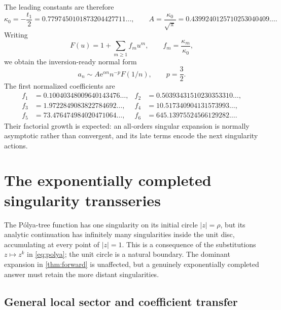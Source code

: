 \documentclass[11pt]{article}
\theoremstyle{definition}
\theoremstyle{remark}
\newcommand{\e}{\mathrm e}
\begin{document}
The leading constants are therefore
\begin{equation}
 \kappa_0=-\frac{t_1}{2}=0.7797450101873204427711\ldots,
 \qquad
 A=\frac{\kappa_0}{\sqrt\pi}
 =0.4399240125710253040409\ldots.
 \label{eq:A-leading}
\end{equation}
Writing
\begin{equation}
 F(u)=1+\sum_{m\geq1}f_mu^m,
 \qquad f_m=\frac{\kappa_m}{\kappa_0},
 \label{eq:F-normalized}
\end{equation}
we obtain the inversion-ready normal form
\begin{equation}
 a_n\sim A\e^{\alpha n}n^{-p}F(1/n),
 \qquad p=\frac32.
 \label{eq:forward-normal}
\end{equation}
The first normalized coefficients are
\begin{align*}
 f_1&=0.10040348009640143476\ldots,&
 f_2&=0.50393431510230353310\ldots,\\
 f_3&=1.9722849083822784692\ldots,&
 f_4&=10.517340904131573993\ldots,\\
 f_5&=73.476474984020471064\ldots,&
 f_6&=645.13975524566129282\ldots.
\end{align*}
Their factorial growth is expected: an all-orders singular expansion is
normally asymptotic rather than convergent, and its late terms encode the
next singularity actions.

\section{The exponentially completed singularity transseries}
\label{sec:global-transseries}

The P\'olya-tree function has one singularity on its initial circle
$|z|=\rho$, but its analytic continuation has infinitely many singularities
inside the unit disc, accumulating at every point of $|z|=1$.  This is a
consequence of the substitutions $z\mapsto z^k$ in \cref{eq:polya}; the unit
circle is a natural boundary.  The dominant expansion in
\cref{thm:forward} is unaffected, but a genuinely exponentially completed
answer must retain the more distant singularities.

\subsection{General local sector and coefficient transfer}
\end{document}
